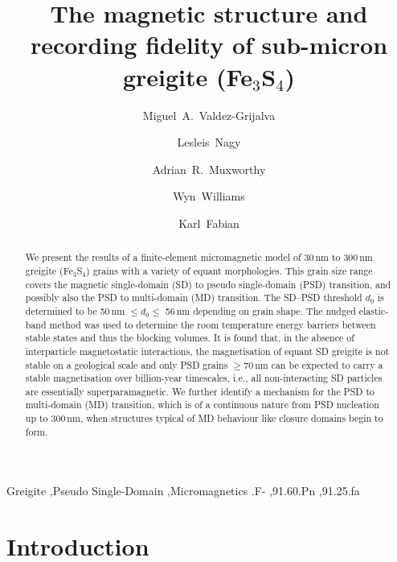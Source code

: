 \documentclass[review,authoryear]{elsarticle}
\newcommand{\nm}{\,\text{nm}}
\begin{document}
\allowdisplaybreaks

\begin{frontmatter}

\title{The magnetic structure and recording fidelity of sub-micron greigite (Fe$_3$S$_4$)}

\author[ic]{Miguel~A.~Valdez-Grijalva}

\author[ed]{Lesleis~Nagy}
\author[ic]{Adrian~R.~Muxworthy}
\author[ed]{Wyn~Williams}
\author[kf]{Karl~Fabian}

\address[ic]{Department of Earth Science and Engineering, Imperial College London, SW7 2BP, UK}
\address[ed]{School of GeoSciences, University of Edinburgh, EH9 3FE, UK}
\address[kf]{Geological Survey of Norway, N-7491, Norway}

\begin{abstract}
We present the results of a finite-element micromagnetic model of 30$\nm$ to 300$\nm$ greigite (Fe$_3$S$_4$) grains with a variety of equant morphologies. This grain size range covers the magnetic single-domain (SD) to pseudo single-domain (PSD) transition, and possibly also the PSD to multi-domain (MD) transition. The SD--PSD threshold $d_0$ is determined to be 50$\nm$ $\leq d_0 \leq$ 56$\nm$ depending on grain shape. The nudged elastic-band method was used to determine the room temperature energy barriers between stable states and thus the blocking volumes. It is found that, in the absence of interparticle magnetostatic interactions, the magnetisation of equant SD greigite is not stable on a geological scale and only PSD grains $\geq 70\,\text{nm}$ can be expected to carry a stable magnetisation over billion-year timescales, i.e., all non-interacting SD particles are essentially superparamagnetic. We further identify a mechanism for the PSD to multi-domain (MD) transition, which is of a continuous nature from PSD nucleation up to 300$\nm$, when structures typical of MD behaviour like closure domains begin to form.
\end{abstract}

\begin{keyword}
Greigite \sep Pseudo Single-Domain \sep Micromagnetics
.F- \sep 91.60.Pn \sep 91.25.fa
\end{keyword}

\end{frontmatter}

\linenumbers

\section{Introduction}
\end{document}
